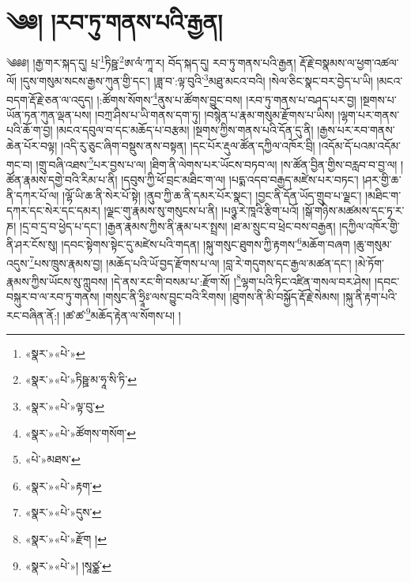 \chapter{༄༅། །རབ་ཏུ་གནས་པའི་རྒྱན།}༄༅༅། །རྒྱ་གར་སྐད་དུ། པྲ་\footnote{«སྣར་»«པེ་»}ཏིཥྛ་\footnote{«སྣར་»«པེ་»ཏིཥྛ་མ་ཧཱ་སི་ཏི་}ཨ་ལཾ་ཀཱ་ར། བོད་སྐད་དུ། རབ་ཏུ་གནས་པའི་རྒྱན། རྡོ་རྗེ་བསྣམས་ལ་ཕྱག་འཚལ་ལོ། །དུས་གསུམ་སངས་རྒྱས་ཀུན་གྱི་དང་། །ཟླ་བ་:ལྟ་བུའི་\footnote{«སྣར་»«པེ་»ལྟ་བུ་}མཐུ་མངའ་བའི། །སེལ་ཅིང་སྣང་བར་བྱེད་པ་ཡི། །མངའ་བདག་རྡོ་རྗེ་ཅན་ལ་འདུད། །:ཚོགས་སོགས་\footnote{«སྣར་»«པེ་»ཚོགས་གསོག་}ནུས་པ་ཚོགས་བྱུང་བས། །རབ་ཏུ་གནས་པ་བཤད་པར་བྱ། །སྔགས་པ་ཡོན་ཏན་ཀུན་ལྡན་པས། །བཀྲ་ཤིས་པ་ཡི་གནས་དག་ཏུ། །བསྙེན་པ་རྣམ་གསུམ་རྫོགས་པ་ཡིས། །ལྷག་པར་གནས་པའི་ཆོ་ག་བྱ། །མངའ་དབུལ་བ་དང་མཆོད་པ་བརྩམ། །སྔགས་ཀྱིས་གནས་པའི་དོན་དུ་ནི། །རྒྱས་པར་རབ་གནས་ཆེན་པོར་བལྟ། །འདི་རུ་ཅུང་ཞིག་བསྡུས་ནས་བསྟན། །དང་པོར་རྡུལ་ཚོན་དཀྱིལ་འཁོར་བྲི། །འདོམ་དོ་པའམ་འདོམ་གང་བ། །གྲུ་བཞི་འཐས་\footnote{«པེ་»མཐས་}པར་བྱས་པ་ལ། །ཐིག་ནི་ལེགས་པར་ཡོངས་བཏབ་ལ། །ས་ཚོན་བྱིན་གྱིས་བརླབ་བ་བྱ་ལ། །ཚོན་རྣམས་དགྱེ་བའི་རིམ་པ་ནི། །དབུས་ཀྱི་ཕོ་བྲང་མཐིང་ག་ལ། །པདྨ་འདབ་བརྒྱད་མཛེས་པར་བཏང་། །ཤར་གྱི་ཆ་ནི་དཀར་པོ་ལ། །ལྷོ་ཡི་ཆ་ནི་སེར་པོ་སྟེ། །ནུབ་ཀྱི་ཆ་ནི་དམར་པོར་སྣང་། །བྱང་ནི་དོན་ཡོད་གྲུབ་པ་ལྗང་། །མཐིང་ག་དཀར་དང་སེར་དང་དམར། །ལྗང་གུ་རྣམས་སུ་གསུངས་པ་ནི། །པཉྩ་རེ་ཁཱའི་རྩིག་པའོ། །སྒོ་གཉིས་མཚམས་དང་ཏྭ་ར་ཎ། །དྲ་བ་དྲ་བ་ཕྱེད་པ་དང་། །རྒྱན་རྣམས་ཀྱིས་ནི་རྣམ་པར་སྤྲས། །ཐ་མ་སྲུང་བ་ཕྲེང་བས་བརྒྱན། །དཀྱིལ་འཁོར་གྱི་ནི་ཤར་ངོས་སུ། །དབང་སྟེགས་སྟེང་དུ་མཛེས་པའི་གདན། །སྐུ་གསུང་ཐུགས་ཀྱི་རྟགས་\footnote{«སྣར་»«པེ་»རྟག་}མཆོག་བཞག །ཆུ་གསུམ་འདུས་\footnote{«སྣར་»«པེ་»དུས་}པས་ཁྲུས་རྣམས་བྱ། །མཆོད་པའི་ཡོ་བྱད་རྫོགས་པ་ལ། །བླ་རེ་གདུགས་དང་རྒྱལ་མཚན་དང་། །མེ་ཏོག་རྣམས་ཀྱིས་ཡོངས་སུ་ཀླུབས། །དེ་ནས་རང་གི་བསམ་པ་:རྫོག་སོ། །\footnote{«སྣར་»«པེ་»རྫོག །}ལྷག་པའི་ཏིང་འཛིན་གསལ་བར་ཤེས། །དབང་བསྐུར་བ་ལ་རབ་ཏུ་གནས། །གསུང་ནི་ཧྲཱིཿ་ལས་བྱུང་བའི་རིགས། །ཐུགས་ནི་མི་བསྐྱོད་རྡོ་རྗེ་སེམས། །སྐུ་ནི་རྟག་པའི་རང་བཞིན་ནོ:། །ཚ་ཚ་\footnote{«སྣར་»«པེ་»། །སཱཙྪ་}མཆོད་རྟེན་ལ་སོགས་པ། །
